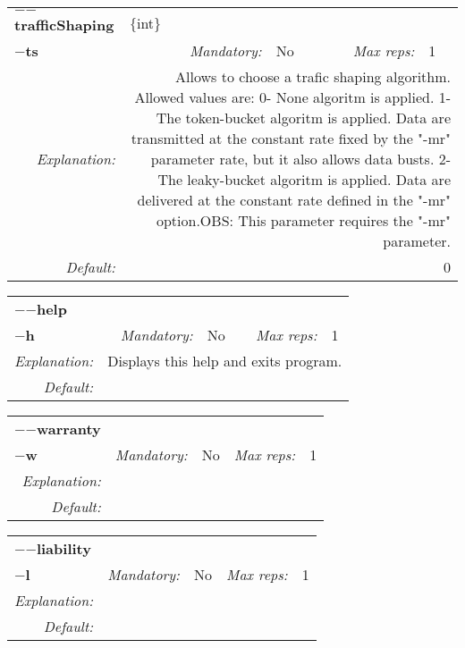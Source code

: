 \begin{center}\begin{tabular}{|rr|rl|rl|}
\hline
\multicolumn{2}{|l|}{\textbf{$-$$-$trafficShaping}} & \multicolumn{4}{|l|}{$\{$int$\}$} \\
\cline{3-6}
\multicolumn{2}{|l|}{\textbf{$-$ts}} & \emph{Mandatory:} & No & \emph{Max reps:} & 1 \\
\hline
\emph{Explanation:} & \multicolumn{5}{|p{12cm}|}{Allows to choose a trafic shaping algorithm. Allowed values are:	0- None algoritm is applied.	1- The token-bucket algoritm is applied. Data are transmitted at the constant rate fixed by the "-mr" parameter rate, but it also allows data busts.	2- The leaky-bucket algoritm is applied. Data are delivered at the constant rate defined in the "-mr" option.OBS: This parameter requires the "-mr" parameter.} \\
\hline
\emph{Default:} & \multicolumn{5}{|p{12cm}|}{0} \\
\hline
\end{tabular}\end{center}
\begin{center}\begin{tabular}{|rr|rl|rl|}
\hline
\multicolumn{2}{|l|}{\textbf{$-$$-$help}} & \multicolumn{4}{|l|}{} \\
\cline{3-6}
\multicolumn{2}{|l|}{\textbf{$-$h}} & \emph{Mandatory:} & No & \emph{Max reps:} & 1 \\
\hline
\emph{Explanation:} & \multicolumn{5}{|p{12cm}|}{Displays this help and exits program.} \\
\hline
\emph{Default:} & \multicolumn{5}{|p{12cm}|}{} \\
\hline
\end{tabular}\end{center}
\begin{center}\begin{tabular}{|rr|rl|rl|}
\hline
\multicolumn{2}{|l|}{\textbf{$-$$-$warranty}} & \multicolumn{4}{|l|}{} \\
\cline{3-6}
\multicolumn{2}{|l|}{\textbf{$-$w}} & \emph{Mandatory:} & No & \emph{Max reps:} & 1 \\
\hline
\emph{Explanation:} & \multicolumn{5}{|p{12cm}|}{} \\
\hline
\emph{Default:} & \multicolumn{5}{|p{12cm}|}{} \\
\hline
\end{tabular}\end{center}
\begin{center}\begin{tabular}{|rr|rl|rl|}
\hline
\multicolumn{2}{|l|}{\textbf{$-$$-$liability}} & \multicolumn{4}{|l|}{} \\
\cline{3-6}
\multicolumn{2}{|l|}{\textbf{$-$l}} & \emph{Mandatory:} & No & \emph{Max reps:} & 1 \\
\hline
\emph{Explanation:} & \multicolumn{5}{|p{12cm}|}{} \\
\hline
\emph{Default:} & \multicolumn{5}{|p{12cm}|}{} \\
\hline
\end{tabular}\end{center}
